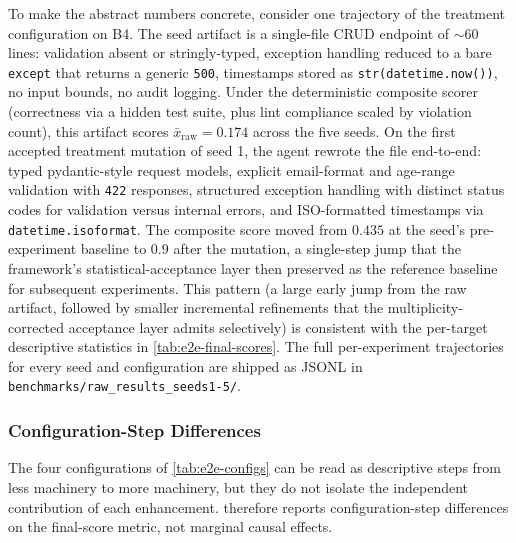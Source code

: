 To make the abstract numbers concrete, consider one trajectory of the treatment configuration on B4.
The seed artifact is a single-file CRUD endpoint of $\sim 60$ lines: validation absent or stringly-typed, exception handling reduced to a bare \texttt{except} that returns a generic \texttt{500}, timestamps stored as \texttt{str(datetime.now())}, no input bounds, no audit logging.
Under the deterministic composite scorer (correctness via a hidden test suite, plus lint compliance scaled by violation count), this artifact scores $\bar{x}_{\text{raw}} = 0.174$ across the five seeds.
On the first accepted treatment mutation of seed 1, the agent rewrote the file end-to-end: typed pydantic-style request models, explicit email-format and age-range validation with \texttt{422} responses, structured exception handling with distinct status codes for validation versus internal errors, and ISO-formatted timestamps via \texttt{datetime.isoformat}.
The composite score moved from $0.435$ at the seed's pre-experiment baseline to $0.9$ after the mutation, a single-step jump that the framework's statistical-acceptance layer then preserved as the reference baseline for subsequent experiments.
This pattern (a large early jump from the raw artifact, followed by smaller incremental refinements that the multiplicity-corrected acceptance layer admits selectively) is consistent with the per-target descriptive statistics in \cref{tab:e2e-final-scores}.
The full per-experiment trajectories for every seed and configuration are shipped as JSONL in \texttt{benchmarks/raw\_results\_seeds1-5/}.

\subsubsection{Configuration-Step Differences}
\label{sec:end-to-end-ablation}

The four configurations of \cref{tab:e2e-configs} can be read as descriptive steps from less machinery to more machinery, but they do not isolate the independent contribution of each enhancement.
 therefore reports configuration-step differences on the final-score metric, not marginal causal effects.

